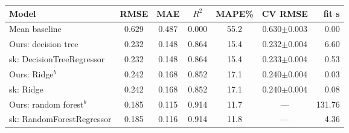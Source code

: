\begin{tabular}{@{}lcccccr@{}}
\toprule
Model & RMSE & MAE & $R^2$ & MAPE\% & CV RMSE & fit s \\
\midrule
Mean baseline & 0.629 & 0.487 & 0.000 & 55.2 & 0.630$\pm$0.003 & 0.00 \\
Ours: decision tree & 0.232 & 0.148 & 0.864 & 15.4 & 0.232$\pm$0.004 & 6.60 \\
sk: DecisionTreeRegressor & 0.232 & 0.148 & 0.864 & 15.4 & 0.233$\pm$0.004 & 0.53 \\
Ours: Ridge$^{b}$ & 0.242 & 0.168 & 0.852 & 17.1 & 0.240$\pm$0.004 & 0.03 \\
sk: Ridge & 0.242 & 0.168 & 0.852 & 17.1 & 0.240$\pm$0.004 & 0.08 \\
Ours: random forest$^{b}$ & 0.185 & 0.115 & 0.914 & 11.7 & --- & 131.76 \\
sk: RandomForestRegressor & 0.185 & 0.116 & 0.914 & 11.8 & --- & 4.36 \\
\bottomrule
\end{tabular}
